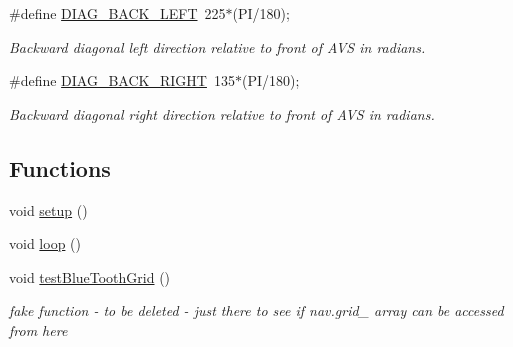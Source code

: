 \begin{DoxyCompactItemize}
\#define \mbox{\hyperlink{bot_main_8ino_ae4e94bd8dbc179e392c03bd987d6b05b}{D\+I\+A\+G\+\_\+\+B\+A\+C\+K\+\_\+\+L\+E\+FT}}~225$\ast$(PI/180);
\begin{DoxyCompactList}\small\item\em Backward diagonal left direction relative to front of A\+VS in radians. \end{DoxyCompactList}\item 
\#define \mbox{\hyperlink{bot_main_8ino_a2556f3b6bde97cfd17b3df68e3fca5fd}{D\+I\+A\+G\+\_\+\+B\+A\+C\+K\+\_\+\+R\+I\+G\+HT}}~135$\ast$(PI/180);
\begin{DoxyCompactList}\small\item\em Backward diagonal right direction relative to front of A\+VS in radians. \end{DoxyCompactList}\end{DoxyCompactItemize}
\subsection*{Functions}
\begin{DoxyCompactItemize}
\item 
void \mbox{\hyperlink{bot_main_8ino_a4fc01d736fe50cf5b977f755b675f11d}{setup}} ()
\item 
void \mbox{\hyperlink{bot_main_8ino_afe461d27b9c48d5921c00d521181f12f}{loop}} ()
\item 
void \mbox{\hyperlink{bot_main_8ino_a8e570cfb3e7e7e8306ab7c755345c5b8}{test\+Blue\+Tooth\+Grid}} ()
\begin{DoxyCompactList}\small\item\em fake function -\/ to be deleted -\/ just there to see if nav.\+grid\+\_\+ array can be accessed from here \end{DoxyCompactList}\end{DoxyCompactItemize}
